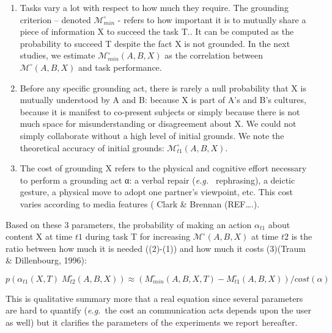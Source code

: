 \documentclass{report}
\newcommand{\eg}{{\textit{e.g.\ }}}
\begin{document}
\begin{enumerate}
    
    \item Tasks vary a lot with respect to how much they require.  The grounding
        criterion – denoted $\mathcal{M}^{\circ}_{min}$  - refers to how
        important it is to mutually share a piece of information X to succeed
        the task T.. It can be computed as the probability to succeed T despite
        the fact X is not grounded. In the next studies, we estimate
        $\mathcal{M}^{\circ}_{min}(A,B,X)$ as the correlation between
        $\mathcal{M}^{\circ}(A,B,X)$ and task performance. 

    \item Before any specific grounding act, there is rarely a null probability
        that X is mutually understood by A and B: because X is part of A's and
        B's cultures, because it is manifest to co-present subjects or simply
        because there is not much space for misunderstanding or disagreement
        about X. We could not simply collaborate without a high level of initial
        grounds. We note the theoretical accuracy of initial grounds:
        $\mathcal{M}^{\circ}_{t1}(A,B,X)$.

    \item The cost of grounding X refers to the physical and cognitive effort
        necessary to perform a grounding act α: a verbal repair (\eg
        rephrasing), a deictic gesture, a physical move to adopt one partner's
        viewpoint, etc. This cost varies according to media features ( Clark \&
        Brennan (REF….). 

\end{enumerate}

Based on these 3 parameters, the probability of making an action $\alpha_{t1}$ about
content X at time $t1$ during task T for increasing $\mathcal{M}^{\circ}(A,B,X)$
at time $t2$ is the ratio between how much it is needed  ((2)-(1)) and how much it
costs (3)(Traum \& Dillenbourg, 1996):

$p(\alpha_{t1}(X,T)   M^{\circ}_{t2}(A,B,X)) ≈ (M^{\circ}_{min}(A,B,X,T) -
M^{\circ}_{t1}(A,B,X))/cost (\alpha)$

This is qualitative summary more that a real equation since several parameters
are hard to quantify (\eg the cost an communication acts depends upon the user
as well) but it clarifies the parameters of the experiments we report hereafter.
\end{document}
